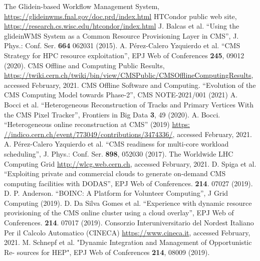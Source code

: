 \documentclass{webofc}
\begin{document}
\begin{thebibliography}{}
 The Glidein-based Workflow Management System, \url{https://glideinwms.fnal.gov/doc.prd/index.html}
 HTCondor public web site, \url{https://research.cs.wisc.edu/htcondor/index.html}
 J. Balcas et al. ``Using the glideinWMS System as a Common Resource Provisioning Layer in CMS'', J. Phys.: Conf. Ser. \textbf{664} 062031 (2015).
 A. P\'erez-Calero Yzquierdo et al. ``CMS Strategy for HPC resource exploitation'', EPJ Web of Conferences \textbf{245}, 09012 (2020).
 CMS Offline and Computing Public Results, \url{https://twiki.cern.ch/twiki/bin/view/CMSPublic/CMSOfflineComputingResults}, accessed February, 2021.
 CMS Offline Software and Computing. ``Evolution of the CMS Computing Model towards Phase-2'', CMS NOTE-2021/001 (2021)
 A. Bocci et al. ``Heterogeneous Reconstruction of Tracks and Primary Vertices With the CMS Pixel Tracker'', Frontiers in Big Data \textbf{3}, 49 (2020). 
 A. Bocci. ``Heterogeneous online reconstruction at CMS'' (2019) \url{https: //indico.cern.ch/event/773049/contributions/3474336/}, accessed February, 2021.
 A. P\'erez-Calero Yzquierdo et al. ``CMS readiness for multi-core workload scheduling'', J. Phys.: Conf. Ser. \textbf{898}, 052030 (2017).
 The Worldwide LHC Computing Grid \url{http://wlcg.web.cern.ch}, accessed February, 2021.
 D. Spiga et al. ``Exploiting private and commercial clouds to generate on-demand CMS computing facilities with DODAS'', EPJ Web of Conferences. \textbf{214}. 07027 (2019). 
 D. P. Anderson. ``BOINC: A Platform for Volunteer Computing'', J Grid Computing (2019).
 D. Da Silva Gomes et al. ``Experience with dynamic resource provisioning of the CMS online cluster using a cloud overlay'', EPJ Web of Conferences. \textbf{214}. 07017 (2019).
 Consorzio Interuniversitario del Nordest Italiano Per il Calcolo Automatico (CINECA) \url{https://www.cineca.it}, accessed February, 2021.
 M. Schnepf et al. "Dynamic Integration and Management of Opportunistic Re- sources for HEP", EPJ Web of Conferences \textbf{214}, 08009 (2019).

\end{thebibliography}
\end{document}
